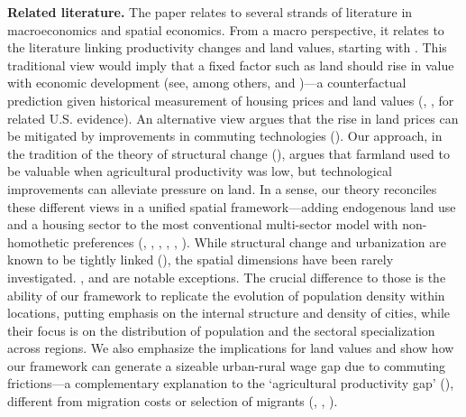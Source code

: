 \documentclass[./20250130-paper.tex]{subfiles}
\begin{document}
\textbf{Related literature.} The paper relates to several strands of literature in macroeconomics and spatial economics. From a macro perspective, it relates to the literature linking productivity changes and land values, starting with \cite{ricardo1817}. This traditional view would imply that a fixed factor such as land should rise in value with economic development (see, among others, \cite{nichols1970land} and \cite{grossman2017house})---a counterfactual prediction given historical measurement of housing prices and land values (\cite{piketty2014capital}, \cite{knoll2017no}, \cite{davisheathcote} for related U.S. evidence). An alternative view argues that the rise in land prices can be mitigated by improvements in commuting technologies (\cite{milessefton2020}). Our approach, in the tradition of the theory of structural change (\cite{herrendorf2014growth}), argues that farmland used to be valuable when agricultural productivity was low, but technological improvements can alleviate pressure on land. In a sense, our theory reconciles these different views in a unified spatial framework---adding endogenous land use and a housing sector to the most conventional multi-sector model with non-homothetic preferences (\cite{kongsamut}, \cite{gollin2007food}, \cite{herrendorf2013aer}, \cite{boppart2014structural}, \cite{comin2015structural}, \cite{alder2019theory}). While structural change and urbanization are known to be tightly linked (\cite{lewis1954economic}), the spatial dimensions have been rarely investigated. \cite{michaelsrauchredding}, \cite{eckertpeters2018} and  \cite{pijoan-mas-budi} are notable exceptions. The crucial difference to those is the ability of our framework to replicate the evolution of population density within locations, putting emphasis on the internal structure and density of cities, while their focus is on the distribution of population and the sectoral specialization across regions. We also emphasize the implications for land values and show how our framework can generate a sizeable urban-rural wage gap due to commuting frictions---a complementary explanation to the `agricultural productivity gap' (\cite{gollin2014agricultural}), different from migration costs or selection of migrants (\cite{restuccia2008agriculture}, \cite{lagakos2013waugh}, \cite{young2013inequality}).    
	
\end{document}
